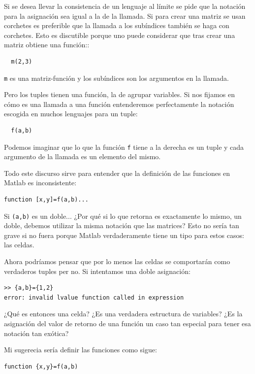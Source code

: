 Si se desea llevar la consistencia de un lenguaje al límite se pide
que la notación para la asignación sea igual a la de la llamada.  Si
para crear una matriz se usan corchetes es preferible que la llamada a
los subíndices también se haga con corchetes.  Esto es discutible
porque uno puede considerar que tras crear una matriz obtiene una
función::

\begin{verbatim}
  m(2,3)
\end{verbatim}

\texttt{m} es una matriz-función y los subíndices son los argumentos
en la llamada.

Pero los tuples tienen una función, la de agrupar variables.  Si nos
fijamos en cómo es una llamada a una función entenderemos
perfectamente la notación escogida en muchos lenguajes para un tuple:

\begin{verbatim}
  f(a,b)
\end{verbatim}

Podemos imaginar que lo que la función \texttt{f} tiene a la derecha
es un tuple y cada argumento de la llamada es un elemento del mismo.

Todo este discurso sirve para entender que la definición de las
funciones en Matlab es inconsistente:

\begin{verbatim}
function [x,y]=f(a,b)...
\end{verbatim}

Si \texttt{(a,b)} es un doble... ¿Por qué si lo que retorna es
exactamente lo mismo, un doble, debemos utilizar la misma notación que
las matrices?  Esto no sería tan grave si no fuera porque Matlab
verdaderamente tiene un tipo para estos casos: las celdas.

Ahora podríamos pensar que por lo menos las celdas se comportarán como
verdaderos tuples per no.  Si intentamos una doble asignación:

\begin{verbatim}
>> {a,b}={1,2}
error: invalid lvalue function called in expression
\end{verbatim}

¿Qué es entonces una celda?  ¿Es una verdadera estructura de
variables?  ¿Es la asignación del valor de retorno de una función un
caso tan especial para tener esa notación tan exótica?

Mi sugerecia sería definir las funciones como sigue:

\begin{verbatim}
function {x,y}=f(a,b)
\end{verbatim}

